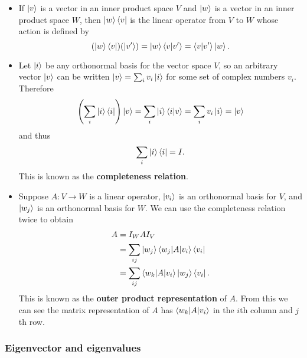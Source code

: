 \documentclass{article}
\begin{document}
\begin{itemize}
  \item If $\ket{v}$ is a vector in an inner product space $V$ and $\ket{w}$ is a vector in an inner product space $W$, then $\ket{w} \bra{v}$ is the linear operator from $V$ to $W$ whose action is defined by \[(\ket{w} \bra{v}) (\ket{v'}) = \ket{w} \braket{v | v'} = \braket{v | v'} \ket{w}.\]

  \item Let $\ket{i}$ be any orthonormal basis for the vector space $V$, so an arbitrary vector $\ket{v}$ can be written $\ket{v} = \sum_i v_i \ket{i}$ for some set of complex numbers $v_i$. Therefore \[\left( \sum_i \ket{i} \bra{i} \right) \ket{v} = \sum_i \ket{i} \braket{i | v} = \sum_i v_i \ket{i} = \ket{v}\] and thus \[\sum_i \ket{i} \bra{i} = I.\] This is known as the \textbf{completeness relation}.

  \item Suppose $A : V \rightarrow W$ is a linear operator, $\ket{v_i}$ is an orthonormal basis for $V$, and $\ket{w_j}$ is an orthonormal basis for $W$. We can use the completeness relation twice to obtain \begin{align*}
          A & = I_W A I_V                                              \\
            & = \sum_{i j} \ket{w_j} \braket{w_j | A | v_i} \bra{v_i}  \\
            & = \sum_{i j} \braket{w_k | A | v_i} \ket{w_j} \bra{v_i}.
        \end{align*} This is known as the \textbf{outer product representation} of $A$. From this we can see the matrix representation of $A$ has $\braket{w_k | A | v_i}$ in the $i$th column and $j$th row.
\end{itemize}

\subsubsection{Eigenvector and eigenvalues}
\end{document}
